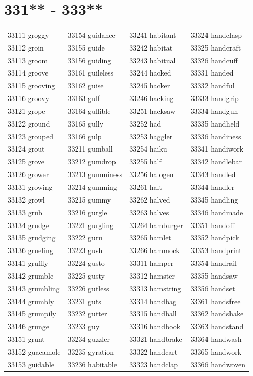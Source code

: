 \documentclass[10pt, oneside]{book}
\begin{document}
\begin{table}
	\centering
	\section*{331** - 333**}
	\begin{tabular}{l l l l}
33111 groggy &33154 guidance &33241 habitant &33324 handclasp\\
33112 groin &33155 guide &33242 habitat &33325 handcraft\\
33113 groom &33156 guiding &33243 habitual &33326 handcuff\\
33114 groove &33161 guileless &33244 hacked &33331 handed\\
33115 grooving &33162 guise &33245 hacker &33332 handful\\
33116 groovy &33163 gulf &33246 hacking &33333 handgrip\\
33121 grope &33164 gullible &33251 hacksaw &33334 handgun\\
33122 ground &33165 gully &33252 had &33335 handheld\\
33123 grouped &33166 gulp &33253 haggler &33336 handiness\\
33124 grout &33211 gumball &33254 haiku &33341 handiwork\\
33125 grove &33212 gumdrop &33255 half &33342 handlebar\\
33126 grower &33213 gumminess &33256 halogen &33343 handled\\
33131 growing &33214 gumming &33261 halt &33344 handler\\
33132 growl &33215 gummy &33262 halved &33345 handling\\
33133 grub &33216 gurgle &33263 halves &33346 handmade\\
33134 grudge &33221 gurgling &33264 hamburger &33351 handoff\\
33135 grudging &33222 guru &33265 hamlet &33352 handpick\\
33136 grueling &33223 gush &33266 hammock &33353 handprint\\
33141 gruffly &33224 gusto &33311 hamper &33354 handrail\\
33142 grumble &33225 gusty &33312 hamster &33355 handsaw\\
33143 grumbling &33226 gutless &33313 hamstring &33356 handset\\
33144 grumbly &33231 guts &33314 handbag &33361 handsfree\\
33145 grumpily &33232 gutter &33315 handball &33362 handshake\\
33146 grunge &33233 guy &33316 handbook &33363 handstand\\
33151 grunt &33234 guzzler &33321 handbrake &33364 handwash\\
33152 guacamole &33235 gyration &33322 handcart &33365 handwork\\
33153 guidable &33236 habitable &33323 handclap &33366 handwoven\\
	\end{tabular}
 \end{table}
\clearpage
\end{document}
